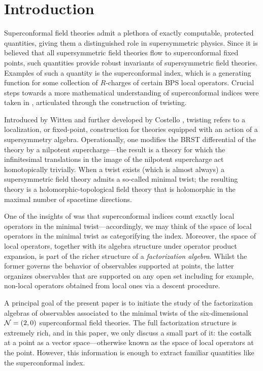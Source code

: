 %
%

%

\section{Introduction}
Superconformal field theories admit a plethora of exactly computable, protected quantities, giving them a distinguished role in supersymmetric physics. 
Since it is believed that all supersymmetric field theories flow to superconformal fixed points, such quantities provide robust invariants of supersymmetric field theories. 
Examples of such a quantity is the superconformal index, which is a generating function for some collection of $R$-charges of certain BPS local operators. 
Crucial steps towards a more mathematical understanding of superconformal indices were taken in \cite{SWchar}, articulated through the construction of twisting.

Introduced by Witten \cite{WittenTwist} and further developed by Costello \cite{CostelloHol}, twisting refers to a localization, or fixed-point, construction for theories equipped with an action of a supersymmetry algebra. 
Operationally, one modifies the BRST differential of the theory by a nilpotent supercharge---the result is a theory for which the infinitesimal translations in the image of the nilpotent supercharge act homotopically trivially. 
When a twist exists (which is almost always) a supersymmetric field theory admits a so-called minimal twist; the resulting theory is a holomorphic-topological field theory that is holomorphic in the maximal number of spacetime directions.

One of the insights of \cite{SWchar} was that superconformal indices count exactly local operators in the minimal twist---accordingly, we may think of the space of local operators in the minimal twist as categorifying the index.
Moreover, the space of local operators, together with its algebra structure under operator product expansion, is part of the richer structure of a \textit{factorization algebra}.
Whilst the former governs the behavior of observables supported at points, the latter organizes observables that are supported on any open set including for example, non-local operators obtained from local ones via a descent procedure.

A principal goal of the present paper is to initiate the study of the factorization algebras of observables associated to the minimal twists of the six-dimensional~$\mathcal N=(2,0)$ superconformal field theories. The full factorization structure is extremely rich, and in this paper, we only discuss a small part of it: the costalk at a point as a vector space---otherwise known as the space of local operators at the point. 
However, this information is enough to extract familiar quantities like the superconformal index.

